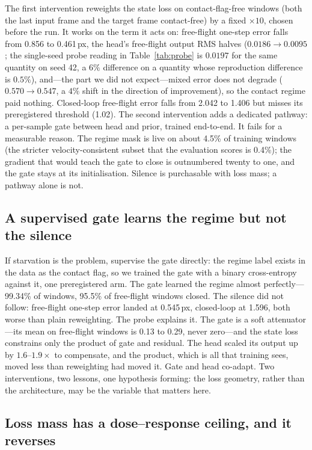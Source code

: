 \documentclass{article}
\begin{document}
The first intervention reweights the state loss on contact-flag-free windows (both the last input frame and the target frame contact-free) by a fixed $\times10$, chosen before the run. It works on the term it acts on: free-flight one-step error falls from 0.856 to 0.461\,px, the head's free-flight output RMS halves ($0.0186 \to 0.0095$; the single-seed probe reading in Table~\ref{tab:probe} is $0.0197$ for the same quantity on seed 42, a $6\%$ difference on a quantity whose reproduction difference is $0.5\%$), and---the part we did not expect---mixed error does not degrade ($0.570 \to 0.547$, a $4\%$ shift in the direction of improvement), so the contact regime paid nothing. Closed-loop free-flight error falls from 2.042 to 1.406 but misses its preregistered threshold (1.02). The second intervention adds a dedicated pathway: a per-sample gate between head and prior, trained end-to-end. It fails for a measurable reason. The regime mask is live on about 4.5\% of training windows (the stricter velocity-consistent subset that the evaluation scores is 0.4\%); the gradient that would teach the gate to close is outnumbered twenty to one, and the gate stays at its initialisation. Silence is purchasable with loss mass; a pathway alone is not.

\subsection{A supervised gate learns the regime but not the silence}

If starvation is the problem, supervise the gate directly: the regime label exists in the data as the contact flag, so we trained the gate with a binary cross-entropy against it, one preregistered arm. The gate learned the regime almost perfectly---99.34\% of windows, 95.5\% of free-flight windows closed. The silence did not follow: free-flight one-step error landed at 0.545\,px, closed-loop at 1.596, both worse than plain reweighting. The probe explains it. The gate is a soft attenuator---its mean on free-flight windows is 0.13 to 0.29, never zero---and the state loss constrains only the product of gate and residual. The head scaled its output up by $1.6$--$1.9\times$ to compensate, and the product, which is all that training sees, moved less than reweighting had moved it. Gate and head co-adapt. Two interventions, two lessons, one hypothesis forming: the loss geometry, rather than the architecture, may be the variable that matters here.

\subsection{Loss mass has a dose--response ceiling, and it reverses}
\end{document}
